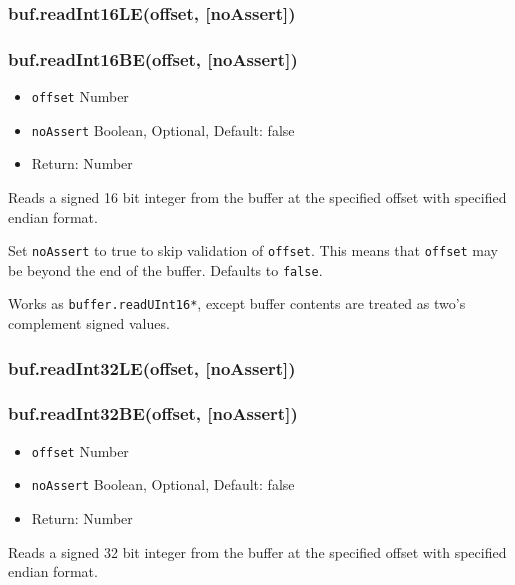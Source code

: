 \subsubsection{buf.readInt16LE(offset,
{[}noAssert{]})}\label{buf.readint16leoffset-noassert}

\subsubsection{buf.readInt16BE(offset,
{[}noAssert{]})}\label{buf.readint16beoffset-noassert}

\begin{itemize}
\itemsep1pt\parskip0pt
\item
  \texttt{offset} Number
\item
  \texttt{noAssert} Boolean, Optional, Default: false
\item
  Return: Number
\end{itemize}

Reads a signed 16 bit integer from the buffer at the specified offset
with specified endian format.

Set \texttt{noAssert} to true to skip validation of \texttt{offset}.
This means that \texttt{offset} may be beyond the end of the buffer.
Defaults to \texttt{false}.

Works as \texttt{buffer.readUInt16*}, except buffer contents are treated
as two's complement signed values.

\subsubsection{buf.readInt32LE(offset,
{[}noAssert{]})}\label{buf.readint32leoffset-noassert}

\subsubsection{buf.readInt32BE(offset,
{[}noAssert{]})}\label{buf.readint32beoffset-noassert}

\begin{itemize}
\itemsep1pt\parskip0pt
\item
  \texttt{offset} Number
\item
  \texttt{noAssert} Boolean, Optional, Default: false
\item
  Return: Number
\end{itemize}

Reads a signed 32 bit integer from the buffer at the specified offset
with specified endian format.

